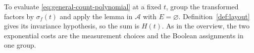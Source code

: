 To evaluate \eqref{eq:general-count-polynomial} at a fixed $t$, group
the transformed factors by $\sigma_f(t)$ and apply the lemma in
$\mathcal A$ with $E=\varnothing$. Definition~\ref{def:layout}
gives its invariance hypothesis, so the sum is $H(t)$. As in the overview, the two exponential costs
are the measurement choices and the Boolean assignments in one group.
